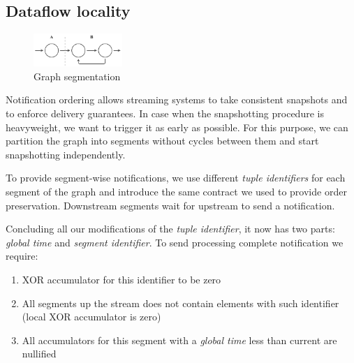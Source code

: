 

\subsection{Dataflow locality}

\begin{figure}[htbp]
  \centering
  \includegraphics[width=0.3\textwidth]{pics/graph-segments.pdf}
  \caption{Graph segmentation}
  \label{fig:tracker-acker-comparison}
\end{figure}

Notification ordering allows streaming systems to take consistent snapshots and to enforce delivery guarantees. In case when the snapshotting procedure is heavyweight, we want to trigger it as early as possible. For this purpose, we can partition the graph into segments without cycles between them and start snapshotting independently.

To provide segment-wise notifications, we use different \textit{tuple identifiers} for each segment of the graph and introduce the same contract we used to provide order preservation. Downstream segments wait for upstream to send a notification. 

Concluding all our modifications of the \textit{tuple identifier}, it now has two parts: \textit{global time} and \textit{segment identifier}. To send processing complete notification we require:
\begin{enumerate}
    \item XOR accumulator for this identifier to be zero
    \item All segments up the stream does not contain elements with such identifier (local XOR accumulator is zero)
    \item All accumulators for this segment with a  \textit{global time} less than current are nullified
\end{enumerate}

